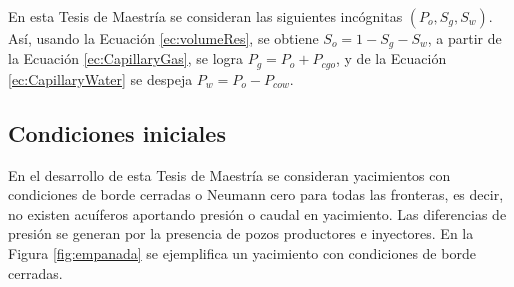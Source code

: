 En esta Tesis de Maestría se consideran las siguientes incógnitas $\left(P_{o}, S_{g}, S_{w}\right)$. Así, usando la Ecuación \ref{ec:volumeRes}, se obtiene $S_{o} = 1 - S_{g} - S_{w}$, a partir de la Ecuación \ref{ec:CapillaryGas}, se logra $P_{g} = P_{o} + P_{cgo}$, y de la Ecuación \ref{ec:CapillaryWater} se despeja $P_{w} = P_{o} - P_{cow}$.





\subsection{Condiciones iniciales}\label{subsec:InitialCond}

En el desarrollo de esta Tesis de Maestría se consideran yacimientos con condiciones de borde cerradas o Neumann cero para todas las fronteras, es decir, no existen acuíferos aportando presión o caudal en yacimiento. Las diferencias de presión se generan por la presencia de pozos productores e inyectores. En la Figura \ref{fig:empanada} se ejemplifica un yacimiento con condiciones de borde cerradas.\\

